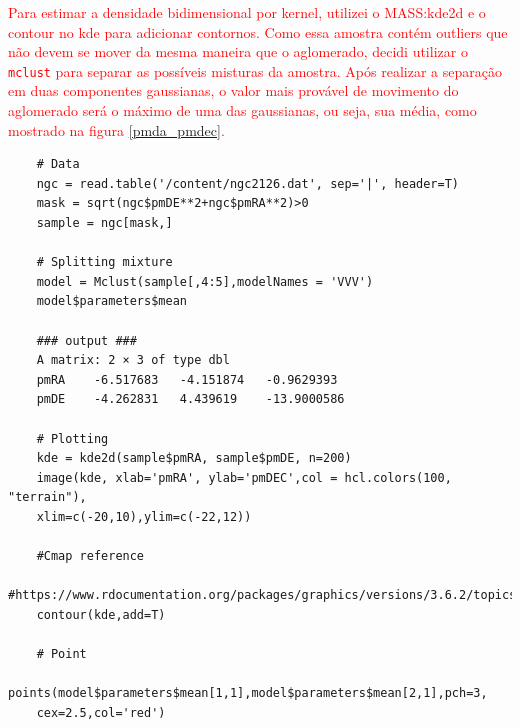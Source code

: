 \textcolor{red}{Para estimar a densidade bidimensional por kernel, utilizei o MASS:kde2d e o contour no kde para adicionar contornos. Como essa amostra contém outliers que não devem se mover da mesma maneira que o aglomerado, decidi utilizar o \texttt{mclust} para separar as possíveis misturas da amostra. Após realizar a separação em duas componentes gaussianas, o valor mais provável de movimento do aglomerado será o máximo de uma das gaussianas, ou seja, sua média, como mostrado na figura \ref{pmda_pmdec}.} 

\vspace{2em}

\begin{lstlisting}
    # Data
    ngc = read.table('/content/ngc2126.dat', sep='|', header=T)
    mask = sqrt(ngc$pmDE**2+ngc$pmRA**2)>0
    sample = ngc[mask,]

    # Splitting mixture
    model = Mclust(sample[,4:5],modelNames = 'VVV')
    model$parameters$mean

    ### output ###
    A matrix: 2 × 3 of type dbl
    pmRA	-6.517683	-4.151874	-0.9629393
    pmDE	-4.262831	4.439619	-13.9000586

    # Plotting
    kde = kde2d(sample$pmRA, sample$pmDE, n=200)
    image(kde, xlab='pmRA', ylab='pmDEC',col = hcl.colors(100, "terrain"), 
    xlim=c(-20,10),ylim=c(-22,12)) 
    
    #Cmap reference
    #https://www.rdocumentation.org/packages/graphics/versions/3.6.2/topics/image
    contour(kde,add=T)

    # Point
    points(model$parameters$mean[1,1],model$parameters$mean[2,1],pch=3,
    cex=2.5,col='red')
\end{lstlisting}

